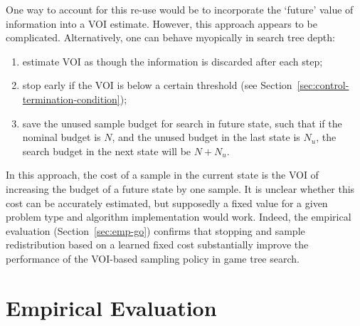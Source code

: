 \documentclass{article}
\begin{document}
One way to account for this re-use would be to incorporate the
`future' value of information into a VOI estimate. However, this 
approach appears to be complicated. Alternatively, one can behave
myopically in search tree depth:
\begin{enumerate}
\item estimate VOI as though the information is discarded after each step;
\item stop early if the VOI is below a certain threshold
   (see Section~\ref{sec:control-termination-condition});
\item save the unused sample budget for search in future state, such that
   if the nominal budget is $N$, and the unused budget in the last state
   is $N_u$, the search budget in the next state will be $N+N_u$.
\end{enumerate}
In this approach, the cost of a sample in the current state is the
VOI of increasing the budget of a future state by one sample.  It is
unclear whether this cost can be accurately estimated, but supposedly
a fixed value for a given problem type and algorithm implementation
would work. Indeed, the empirical evaluation (Section~\ref{sec:emp-go})
confirms that stopping and sample redistribution based on a learned
fixed cost  substantially improve the performance of the VOI-based
sampling policy in game tree search.


\section{Empirical Evaluation}
\label{sec:empirical-evaluation}
\end{document}
